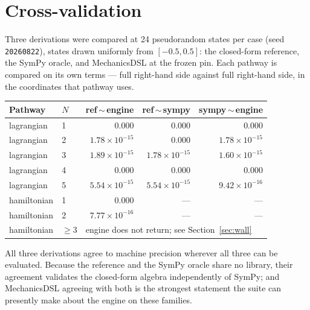 \documentclass[11pt,a4paper]{article}
\begin{document}
\section{Cross-validation}\label{sec:xval}

Three derivations were compared at 24 pseudorandom states per case (seed
\texttt{20260822}), states drawn uniformly from $[-0.5,0.5]$: the closed-form
reference, the SymPy oracle, and MechanicsDSL at the frozen pin. Each pathway
is compared on its own terms --- full right-hand side against full right-hand
side, in the coordinates that pathway uses.

\begin{center}
\begin{tabular}{@{}llrrr@{}}
\toprule
\textbf{Pathway} & \textbf{$N$} & \textbf{ref\,$\sim$\,engine} & \textbf{ref\,$\sim$\,sympy} & \textbf{sympy\,$\sim$\,engine} \\
\midrule
lagrangian  & 1 & $0.000$          & $0.000$          & $0.000$ \\
lagrangian  & 2 & $1.78\!\times\!10^{-15}$ & $0.000$  & $1.78\!\times\!10^{-15}$ \\
lagrangian  & 3 & $1.89\!\times\!10^{-15}$ & $1.78\!\times\!10^{-15}$ & $1.60\!\times\!10^{-15}$ \\
lagrangian  & 4 & $0.000$          & $0.000$          & $0.000$ \\
lagrangian  & 5 & $5.54\!\times\!10^{-15}$ & $5.54\!\times\!10^{-15}$ & $9.42\!\times\!10^{-16}$ \\
\midrule
hamiltonian & 1 & $0.000$          & ---              & --- \\
hamiltonian & 2 & $7.77\!\times\!10^{-16}$ & ---      & --- \\
hamiltonian & $\geq 3$ & \multicolumn{3}{l}{engine does not return; see Section~\ref{sec:wall}} \\
\bottomrule
\end{tabular}
\end{center}

All three derivations agree to machine precision wherever all three can be
evaluated. Because the reference and the SymPy oracle share no library, their
agreement validates the closed-form algebra independently of SymPy; and
MechanicsDSL agreeing with both is the strongest statement the suite can
presently make about the engine on these families.
\end{document}
